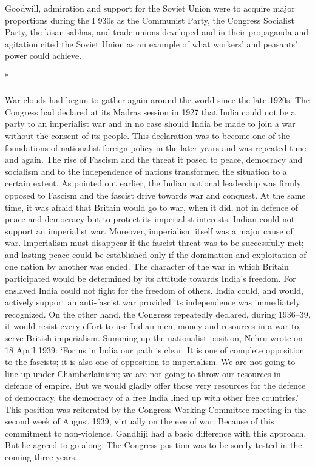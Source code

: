 Goodwill, admiration and support for the Soviet Union were to acquire major proportions during the I 930s as the Communist Party, the Congress Socialist Party, the kisan sabhas, and trade unions developed and in their propaganda and agitation cited the Soviet Union as an example of what workers' and peasants' power could achieve.

\begin{center}*\end{center}

\paragraph*{}

War clouds had begun to gather again around the world since the late 1920s. The Congress had declared at its Madras session in 1927 that India could not be a party to an imperialist war and in no case should India be made to join a war without the consent of its people. This declaration was to become one of the foundations of nationalist foreign policy in the later years and was repeated time and again. The rise of Fascism and the threat it posed to peace, democracy and socialism and to the independence of nations transformed the situation to a certain extent. As pointed out earlier, the Indian national leadership was firmly opposed to Fascism and the fascist drive towards war and conquest. At the same time, it was afraid that Britain would go to war, when it did, not in defence of peace and democracy but to protect its imperialist interests. Indian could not support an imperialist war. Moreover, imperialism itself was a major cause of war. Imperialism must disappear if the fascist threat was to be successfully met; and lasting peace could be established only if the domination and exploitation of one nation by another was ended. The character of the war in which Britain participated would be determined by its attitude towards India's freedom. For enslaved India could not fight for the freedom of others. India could, and would, actively support an anti-fascist war provided its independence was immediately recognized. On the other hand, the Congress repeatedly declared, during 1936--39, it would resist every effort to use Indian men, money and resources in a war to, serve British imperialism. Summing up the nationalist position, Nehru wrote on 18 April 1939: `For us in India our path is clear. It is one of complete opposition to the fascists; it is also one of opposition to imperialism. We are not going to line up under Chamberlainism; we are not going to throw our resources in defence of empire. But we would gladly offer those very resources for the defence of democracy, the democracy of a free India lined up with other free countries.' This position was reiterated by the Congress Working Committee meeting in the second week of August 1939, virtually on the eve of war. Because of this commitment to non-violence, Gandhiji had a basic difference with this approach. But he agreed to go along. The Congress position was to be sorely tested in the coming three years.
